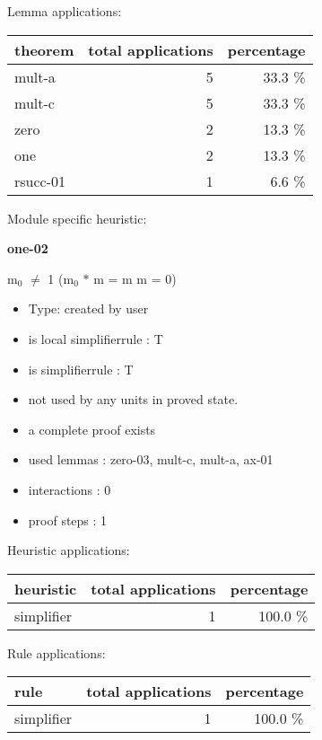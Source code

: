 \documentclass[a4paper]{article}
\begin{document}
Lemma applications:

\begin{supertabular}{l|r|r}
theorem	        & total applications & percentage \\ \hline
mult-a & 5 & 33.3 \% \\
mult-c & 5 & 33.3 \% \\
zero & 2 & 13.3 \% \\
one & 2 & 13.3 \% \\
rsucc-01 & 1 & 6.6 \% \\

\end{supertabular}

Module specific heuristic:

\pagebreak

{\LARGE\bf one-02}\label{lemma-one-02}

\medskip

 \Fol $\mbox{m}_{0}$ $\neq$ 1 \Imp ($\mbox{m}_{0}$ $*$ m = m \Equiv m = 0)

\begin{itemize}

\item Type: created by user

\item is local simplifierrule : T
\item is simplifierrule : T
\item not used by any units in proved state.
\item       a complete proof exists
\item       used lemmas  : zero-03, mult-c, mult-a, ax-01
\item       interactions : 0
\item       proof steps  : 1
\end{itemize}

\medskip


Heuristic applications:

\begin{supertabular}{l|r|r}
heuristic	& total applications & percentage \\ \hline
simplifier & 1 & 100.0 \% \\

\end{supertabular}

Rule applications:

\begin{supertabular}{l|r|r}
rule	        & total applications & percentage \\ \hline
simplifier & 1 & 100.0 \% \\

\end{supertabular}
\end{document}
